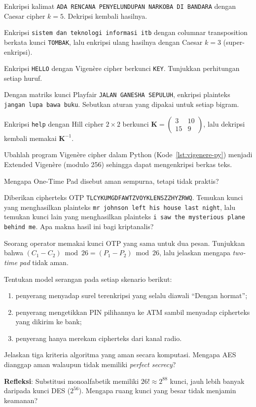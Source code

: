 \documentclass[main.tex]{subfiles}
\begin{document}
\begin{latihan}
  \item Enkripsi kalimat \texttt{ADA RENCANA PENYELUNDUPAN NARKOBA DI BANDARA} dengan Caesar cipher $k=5$. Dekripsi kembali hasilnya.
  \item Enkripsi \texttt{sistem dan teknologi informasi itb} dengan columnar transposition berkata kunci \texttt{TOMBAK}, lalu enkripsi ulang hasilnya dengan Caesar $k=3$ (super-enkripsi).
  \item Enkripsi \texttt{HELLO} dengan Vigen\`{e}re cipher berkunci \texttt{KEY}. Tunjukkan perhitungan setiap huruf.
  \item Dengan matriks kunci Playfair \texttt{JALAN GANESHA SEPULUH}, enkripsi plainteks \texttt{jangan lupa bawa buku}. Sebutkan aturan yang dipakai untuk setiap bigram.
  \item Enkripsi \texttt{help} dengan Hill cipher $2 \times 2$ berkunci $\mathbf{K} = \begin{pmatrix} 3 & 10 \\ 15 & 9 \end{pmatrix}$, lalu dekripsi kembali memakai $\mathbf{K}^{-1}$.
  \item Ubahlah program Vigen\`{e}re cipher dalam Python (Kode~\ref{lst:vigenere-py}) menjadi Extended Vigen\`{e}re (modulo 256) sehingga dapat mengenkripsi berkas teks.
  \item Mengapa One-Time Pad disebut aman sempurna, tetapi tidak praktis?
  \item Diberikan cipherteks OTP \texttt{TLCYKUMGDFAWTZVOYKLENSZZHYZRWQ}. Temukan kunci yang menghasilkan plainteks \texttt{mr johnson left his house last night}, lalu temukan kunci lain yang menghasilkan plainteks \texttt{i saw the mysterious plane behind me}. Apa makna hasil ini bagi kriptanalis?
  \item Seorang operator memakai kunci OTP yang sama untuk dua pesan. Tunjukkan bahwa $(C_1 - C_2) \bmod 26 = (P_1 - P_2) \bmod 26$, lalu jelaskan mengapa \textit{two-time pad} tidak aman.
  \item Tentukan model serangan pada setiap skenario berikut:
  \begin{enumerate}
    \item penyerang menyadap surel terenkripsi yang selalu diawali ``Dengan hormat'';
    \item penyerang mengetikkan PIN pilihannya ke ATM sambil menyadap cipherteks yang dikirim ke bank;
    \item penyerang hanya merekam cipherteks dari kanal radio.
  \end{enumerate}
  \item Jelaskan tiga kriteria algoritma yang aman secara komputasi. Mengapa AES dianggap aman walaupun tidak memiliki \textit{perfect secrecy}?
  \item \textbf{Refleksi}: Substitusi monoalfabetik memiliki $26! \approx 2^{88}$ kunci, jauh lebih banyak daripada kunci DES ($2^{56}$). Mengapa ruang kunci yang besar tidak menjamin keamanan?
\end{latihan}
\end{document}
